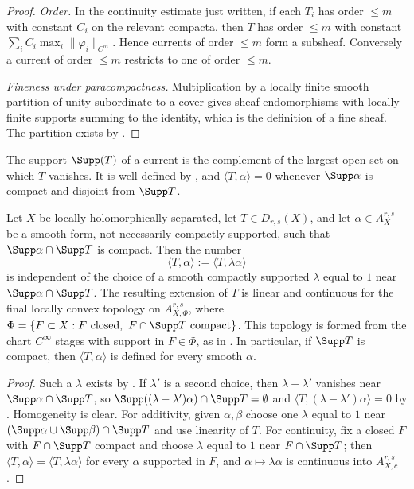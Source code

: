 \begin{proof}
\emph{Order.}  In the continuity estimate just written, if each $T_i$ has
order $\le m$ with constant $C_i$ on the relevant compacta, then $T$ has order
$\le m$ with constant $\sum_iC_i\max_i\|\varphi_i\|_{C^m}$.  Hence
currents of order $\le m$ form a subsheaf.  Conversely a current of order
$\le m$ restricts to one of order $\le m$.

\emph{Fineness under paracompactness.} Multiplication by a locally finite
smooth partition of unity
subordinate to a cover gives sheaf endomorphisms with locally finite supports
summing to the identity, which is the definition of a fine sheaf.  The
partition exists by .
\end{proof}

\begin{definition}[Support]
\label{def:ch14-support}
The support $\Supp(T)$ of a current is the complement of the largest open set
on which $T$ vanishes.  It is well defined by
, and $\langle T,\alpha\rangle=0$ whenever
$\Supp\alpha$ is compact and disjoint from $\Supp T$.
\end{definition}

\begin{lemma}
\label{lem:ch14-phi-support}
Let $X$ be locally holomorphically separated, let $T\in D_{r,s}(X)$,
and let $\alpha\in A_X^{r,s}$ be a smooth form, not
necessarily compactly supported, such that $\Supp\alpha\cap\Supp T$ is
compact.  Then the number
\[
 \langle T,\alpha\rangle:=\langle T,\lambda\alpha\rangle
\]
is independent of the choice of a smooth compactly supported $\lambda$ equal
to $1$ near $\Supp\alpha\cap\Supp T$.  The resulting extension of $T$ is
linear and continuous for the final locally convex topology on
$A_{X,\Phi}^{r,s}$, where
$\Phi=\{F\subset X: F\text{ closed},\ F\cap\Supp T\text{ compact}\}$.
This topology is formed from the chart $C^\infty$ stages with support
in $F\in\Phi$, as in .  In
particular, if $\Supp T$ is compact, then $\langle T,\alpha\rangle$ is defined
for every smooth $\alpha$.
\end{lemma}

\begin{proof}
Such a $\lambda$ exists by \cite[Corollary~15.2.5]{CLD25}.  If $\lambda'$ is a
second choice, then $\lambda-\lambda'$ vanishes near
$\Supp\alpha\cap\Supp T$, so
$\Supp((\lambda-\lambda')\alpha)\cap\Supp T=\emptyset$ and
$\langle T,(\lambda-\lambda')\alpha\rangle=0$ by .
Homogeneity is clear.  For additivity, given $\alpha,\beta$ choose one
$\lambda$ equal to $1$ near
$(\Supp\alpha\cup\Supp\beta)\cap\Supp T$ and use linearity of $T$.  For
continuity, fix a closed $F$ with $F\cap\Supp T$ compact and choose $\lambda$
equal to $1$ near $F\cap\Supp T$; then
$\langle T,\alpha\rangle=\langle T,\lambda\alpha\rangle$ for every $\alpha$
supported in $F$, and $\alpha\mapsto\lambda\alpha$ is continuous into
$A_{X,c}^{r,s}$.
\end{proof}

